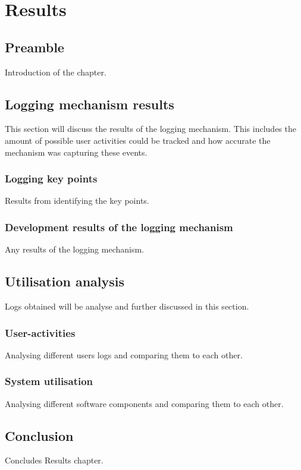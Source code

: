 \chapter{Results}
\label{chap:3}

\section{Preamble}
Introduction of the chapter.

\section{Logging mechanism results}
This section will discuss the results of the logging mechanism. This includes the amount of possible user activities could be tracked and how accurate the mechanism was capturing these events.

\subsection{Logging key points}
Results from identifying the key points.

\subsection{Development results of the logging mechanism}
Any results of the logging mechanism.

\section{Utilisation analysis}
Logs obtained will be analyse and further discussed in this section.

\subsection{User-activities}
Analysing different users logs and comparing them to each other.

\subsection{System utilisation}
Analysing different software components and comparing them to each other.

\section{Conclusion}
Concludes Results chapter.